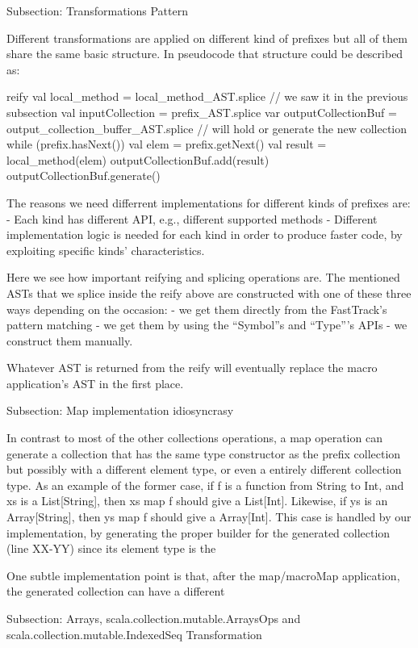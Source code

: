 Subsection: Transformations Pattern

Different transformations are applied on different kind of prefixes but all of
them share the same basic structure. In pseudocode that structure could be
described as:

reify {
  val local_method = local_method_AST.splice // we saw it in the previous
subsection
  val inputCollection = prefix_AST.splice
  var outputCollectionBuf = output_collection_buffer_AST.splice // will
hold or generate the new collection
  while (prefix.hasNext()) {
    val elem = prefix.getNext()
    val result = local_method(elem)
    outputCollectionBuf.add(result)
  }
  outputCollectionBuf.generate()
}

The reasons we need differrent implementations for different kinds of
prefixes are:
- Each kind has different API, e.g., different supported methods
- Different implementation logic is needed for each kind in order to produce
faster code, by exploiting specific kinds' characteristics.

Here we see how important reifying and splicing operations are. The mentioned
ASTs that we splice inside the reify above are constructed with one of these
three ways depending on the occasion:
- we get them directly from the FastTrack's pattern matching
- we get them by using the ``Symbol''s and ``Type'''s APIs
- we construct them manually.

Whatever AST is returned from the reify will eventually replace the macro
application's AST in the first place.


Subsection: Map implementation idiosyncrasy

In contrast to most of the other collections operations, a map operation can
generate a collection that has the same type constructor as the prefix
collection but possibly with a different element type, or even a entirely
different collection type. As an example of the former case, if f is a function
from String to Int, and xs is a List[String], then xs map f should give a
List[Int]. Likewise, if ys is an Array[String], then ys map f should give a
Array[Int]. This case is handled by our implementation, by generating the
proper builder for the generated collection (line XX-YY) since its element
type is the  
 

One subtle implementation point is that, after the map/macroMap application, the
generated collection can have a different 



Subsection: Arrays, scala.collection.mutable.ArraysOps and
scala.collection.mutable.IndexedSeq Transformation

